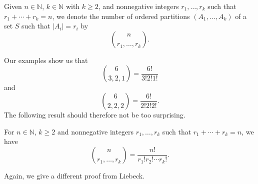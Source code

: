 \documentclass[11pt,dvipsnames]{book}
\numberwithin{figure}{section} %
\numberwithin{table}{section} %
\begin{document}
\begin{definition}
Given $n \in \mathbb{N}$, $k \in \mathbb{N}$ with $k \geq 2$, and nonnegative integers $r_{1}, \dots ,r_{k}$ such that $r_{1}+\cdots + r_{k}=n$, we denote the number of ordered partitions $(A_{1}, \dots ,A_{k})$ of a set $S$ such that $|A_{i}|=r_{i}$ by
\[
{n \choose r_{1}, \dots , r_{k}}.
\]
\end{definition}

Our examples show us that
\[
{6 \choose 3, 2, 1} = \frac{6!}{3!2!1!}
\]
and
\[
{6 \choose 2,2,2} = \frac{6!}{2!2!2!}.
\]
The following result should therefore not be too surprising.
\begin{theorem}
\label{t:mutlinomial}
For $n \in \mathbb{N}$, $k \geq 2$ and nonnegative integers $r_{1}, \dots ,r_{k}$ such that $r_{1}+\cdots + r_{k}=n$, we have
\[
{n \choose r_{1}, \dots , r_{k}} = \frac{n!}{r_{1}!r_{2}!\cdots r_{k}!}.
\]
\end{theorem}

Again, we give a different proof from Liebeck.
\end{document}
